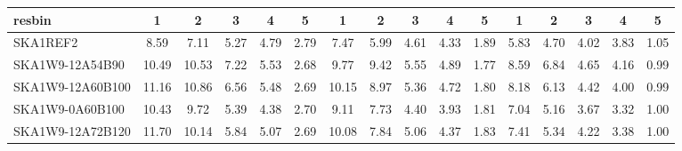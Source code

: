 \begin{table}[H]
{{\begin{tabular}{|lccccc||ccccc||ccccc|}
 resbin  &1 & 2 & 3 & 4 & 5 & 1 & 2 & 3 & 4 & 5 & 1 & 2 & 3 & 4 & 5 \\ \hline
SKA1REF2 & 8.59 \cellcolor{blue!18.00} & 7.11 \cellcolor{red!18.00} & 5.27 \cellcolor{green!18.00} & 4.79 \cellcolor{orange!32.97} & 2.79 \cellcolor{purple!60.00} & 7.47 \cellcolor{blue!18.00} & 5.99 \cellcolor{red!18.00} & 4.61 \cellcolor{green!25.67} & 4.33 \cellcolor{orange!35.50} & 1.89 \cellcolor{purple!60.00} & 5.83 \cellcolor{blue!18.00} & 4.70 \cellcolor{red!18.00} & 4.02 \cellcolor{green!33.00} & 3.83 \cellcolor{orange!46.41} & 1.05 \cellcolor{purple!60.00}\\ \hline 
SKA1W9-12A54B90 & 10.49 \cellcolor{blue!42.63} & 10.53 \cellcolor{red!56.30} & 7.22 \cellcolor{green!60.00} & 5.53 \cellcolor{orange!60.00} & 2.68 \cellcolor{purple!18.00} & 9.77 \cellcolor{blue!54.04} & 9.42 \cellcolor{red!60.00} & 5.55 \cellcolor{green!60.00} & 4.89 \cellcolor{orange!60.00} & 1.77 \cellcolor{purple!18.00} & 8.59 \cellcolor{blue!60.00} & 6.84 \cellcolor{red!60.00} & 4.65 \cellcolor{green!60.00} & 4.16 \cellcolor{orange!60.00} & 0.99 \cellcolor{purple!18.00}\\ \hline 
SKA1W9-12A60B100 & 11.16 \cellcolor{blue!51.31} & 10.86 \cellcolor{red!60.00} & 6.56 \cellcolor{green!45.78} & 5.48 \cellcolor{orange!58.17} & 2.69 \cellcolor{purple!21.82} & 10.15 \cellcolor{blue!60.00} & 8.97 \cellcolor{red!54.49} & 5.36 \cellcolor{green!53.06} & 4.72 \cellcolor{orange!52.56} & 1.80 \cellcolor{purple!28.50} & 8.18 \cellcolor{blue!53.76} & 6.13 \cellcolor{red!46.07} & 4.42 \cellcolor{green!50.14} & 4.00 \cellcolor{orange!53.41} & 0.99 \cellcolor{purple!18.00}\\ \hline 
SKA1W9-0A60B100 & 10.43 \cellcolor{blue!41.85} & 9.72 \cellcolor{red!47.23} & 5.39 \cellcolor{green!20.58} & 4.38 \cellcolor{orange!18.00} & 2.70 \cellcolor{purple!25.64} & 9.11 \cellcolor{blue!43.70} & 7.73 \cellcolor{red!39.31} & 4.40 \cellcolor{green!18.00} & 3.93 \cellcolor{orange!18.00} & 1.81 \cellcolor{purple!32.00} & 7.04 \cellcolor{blue!36.41} & 5.16 \cellcolor{red!27.03} & 3.67 \cellcolor{green!18.00} & 3.32 \cellcolor{orange!25.41} & 1.00 \cellcolor{purple!25.00}\\ \hline 
SKA1W9-12A72B120 & 11.70 \cellcolor{blue!58.31} & 10.14 \cellcolor{red!51.94} & 5.84 \cellcolor{green!30.28} & 5.07 \cellcolor{orange!43.20} & 2.69 \cellcolor{purple!21.82} & 10.08 \cellcolor{blue!58.90} & 7.84 \cellcolor{red!40.65} & 5.06 \cellcolor{green!42.10} & 4.37 \cellcolor{orange!37.25} & 1.83 \cellcolor{purple!39.00} & 7.41 \cellcolor{blue!42.04} & 5.34 \cellcolor{red!30.56} & 4.22 \cellcolor{green!41.57} & 3.38 \cellcolor{orange!27.88} & 1.00 \cellcolor{purple!25.00}\\ \hline 

\end{tabular}}}
\end{table}
